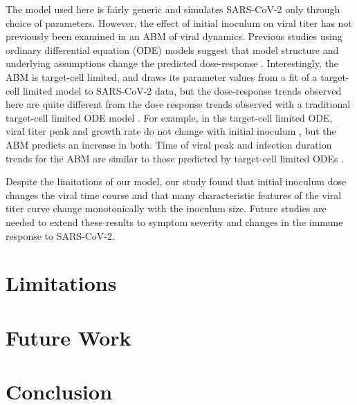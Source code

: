 The model used here is fairly generic and simulates SARS-CoV-2 only through choice of parameters. However, the effect of initial inoculum on viral titer has not previously been examined in an ABM of viral dynamics. Previous studies using ordinary differential equation (ODE) models suggest that model structure and underlying assumptions change the predicted dose-response \cite{wethington19, li14}. Interestingly, the ABM is target-cell limited, and draws its parameter values from a fit of a target-cell limited model to SARS-CoV-2 data, but the dose-response trends observed here are quite different from the dose response trends observed with a traditional target-cell limited ODE model \cite{wethington19,li14}. For example, in the target-cell limited ODE, viral titer peak and growth rate do not change with initial inoculum \cite{wethington19, li14}, but the ABM predicts an increase in both. Time of viral peak and infection duration trends for the ABM are similar to those predicted by target-cell limited ODEs \cite{wethington19, li14}.

Despite the limitations of our model, our study found that initial inoculum dose changes the viral time course and that many characteristic features of the viral titer curve change monotonically with the inoculum size. Future studies are needed to extend these results to symptom severity and changes in the immune response to SARS-CoV-2.


\section{Limitations}
\section{Future Work}
\section{Conclusion}

